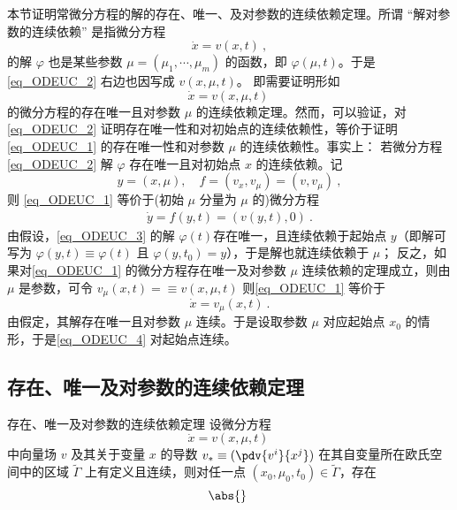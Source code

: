 
本节证明常微分方程的解的存在、唯一、及对参数的连续依赖定理。所谓 “解对参数的连续依赖” 是指微分方程
\begin{equation}\label{eq_ODEUC_2}
\dot x=v(x,t)~,
\end{equation}
 的解 $\varphi$ 也是某些参数 $\mu=(\mu_1,\cdots,\mu_m)$ 的函数，即 $\varphi(\mu,t)$。于是 \autoref{eq_ODEUC_2} 右边也因写成 $v(x,\mu,t)$。 即需要证明形如
\begin{equation}\label{eq_ODEUC_1}
\dot x=v(x,\mu,t)~
\end{equation}
的微分方程的存在唯一且对参数 $\mu$ 的连续依赖定理。然而，可以验证，对\autoref{eq_ODEUC_2} 证明存在唯一性和对初始点的连续依赖性，等价于证明\autoref{eq_ODEUC_1} 的存在唯一性和对参数 $\mu$ 的连续依赖性。事实上：
若微分方程\autoref{eq_ODEUC_2} 解 $\varphi$ 存在唯一且对初始点 $x$ 的连续依赖。记 
\begin{equation}
y=(x,\mu),\quad f=(v_x,v_{\mu})=(v,v_{\mu})~,
\end{equation}
则 \autoref{eq_ODEUC_1} 等价于(初始 $\mu$ 分量为 $\mu$ 的)微分方程
\begin{equation}\label{eq_ODEUC_3}
\begin{aligned}
\dot y=f(y,t)=(v(y,t),0)~.
\end{aligned}
\end{equation}
由假设，\autoref{eq_ODEUC_3} 的解 $\varphi(t)$存在唯一，且连续依赖于起始点 $y$（即解可写为 $\varphi(y,t)\equiv\varphi(t)$ 且 $\varphi(y,t_0)=y$），于是解也就连续依赖于 $\mu$；
反之，如果对\autoref{eq_ODEUC_1} 的微分方程存在唯一及对参数 $\mu$ 连续依赖的定理成立，则由 $\mu$ 是参数，可令 $v_\mu(x,t)=\equiv v(x,\mu,t)$ 则\autoref{eq_ODEUC_1} 等价于
\begin{equation}\label{eq_ODEUC_4} 
\dot x=v_{\mu}(x,t)~.
\end{equation}
由假定，其解存在唯一且对参数 $\mu$ 连续。于是设取参数 $\mu$ 对应起始点 $x_0$ 的情形，于是\autoref{eq_ODEUC_4} 对起始点连续。


\subsection{存在、唯一及对参数的连续依赖定理}
\begin{theorem}{存在、唯一及对参数的连续依赖定理}
设微分方程
\begin{equation}
\dot x=v(x,\mu,t)~
\end{equation}
中向量场 $v$ 及其关于变量 $x$ 的导数 $v_*\equiv(\pdv{v^i}{x^j})$ 在其自变量所在欧氏空间中的区域 $\tilde\Gamma$ 上有定义且连续，则对任一点 $(x_0,\mu_0,t_0)\in\tilde\Gamma$，存在
\begin{equation}
\abs{}~
\end{equation}

\end{theorem}
